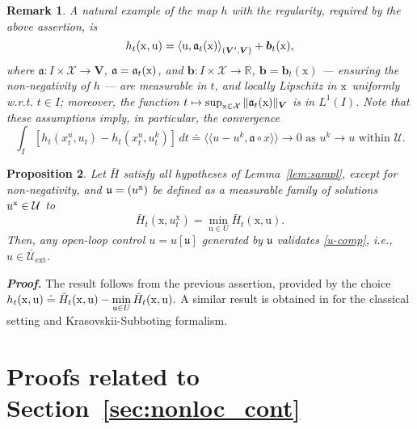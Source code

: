 \documentclass[sn-mathphys-num]{sn-jnl}
\numberwithin{equation}{section}
\theoremstyle{mythm}
\newtheorem{proposition}{Proposition}[section]
\theoremstyle{mydef}
\newtheorem{remark}[proposition]{Remark}
\renewenvironment{proof}{\smallskip\noindent\emph{\textbf{Proof.}}%
  \hspace{1pt}}{\hspace{-5pt}{\nobreak\quad\nobreak\hfill\nobreak%
    $\square$\vspace{2pt}\par}\smallskip\goodbreak}
\renewcommand{\d}{\,d}
\newcommand{\R}{\mathbb{R}}
\begin{document}
\begin{remark}
    A natural example of the map $h$ with the regularity, required by the above assertion, is
$$h_t(\mathrm x, \mathrm u)= \left\langle{\rm u}, \mathfrak a_t(\mathrm x)\right\rangle _{(\bm V', \bm V)} + \bm b_t(\mathrm x),
$$
where $\mathfrak a\colon I \times \mathcal X \to \bm V$, $\mathfrak a={\mathfrak a}_t(\rm x)$, and ${\bm b}\colon I \times \mathcal X \to \R$, $\bm b={\bm b}_t(\mathrm x)$ --- ensuring the non-negativity of $h$ --- are measurable in $t$, and locally Lipschitz in $\rm x$ uniformly w.r.t. $t \in I$; moreover, the function $t \mapsto \sup_{\rm x \in \mathcal X}\|\mathfrak{a}_t (\mathrm x)\|_{\bm{V}}$ is in $L^1(I)$. Note that these assumptions imply, in particular, the convergence
\[
    \int_I \left[h_t(x_t^{u}, u_t) - h_t(x_t^{u}, u^k_t)\right] \d t \doteq \langle\!\langle u - u^{k},   \mathfrak{a}\circ x\rangle\!\rangle \to 0\mbox{ as }u^k \to u\mbox{ within }\mathcal U.
\]

\end{remark}

\begin{proposition}
    Let $\bar H$ satisfy all hypotheses of Lemma~\ref{lem:sampl}, except for non-negativity, and $\mathfrak{u}=(u^{\rm x})$ be defined as a measurable family of solutions $u^{\rm x} \in \mathcal U$ to~%
\[
 \bar H_t (\mathrm x, u^{\mathrm x}_t) = \min_{{\mathrm u} \in U} \bar H_t(\mathrm{ x}, {\mathrm u}).
\]    
Then, any open-loop control \(u = u[\mathfrak{u}]\) generated by $\mathfrak{u}$ validates \eqref{u-comp}, i.e., $u\in {\bar{\mathcal U}}_\text{ext}$.   
\end{proposition}
\begin{proof}
    The result follows from the previous assertion, provided by the choice
    \(
        \displaystyle h_t(\mathrm x, \mathrm{u}) \doteq  \bar H_t ({\rm x, u}) - \min_{{\mathrm u} \in U} \bar H_t(\mathrm{ x}, {\mathrm u}).
    \)
\end{proof}
A similar result is obtained in \cite{pogodaevExactFormulaeIncrement2024} for the classical setting and Krasovskii-Subboting formalism.


\section{Proofs related to Section~\ref{sec:nonloc_cont}}\label{sec:Wflowdiff} %
\end{document}
